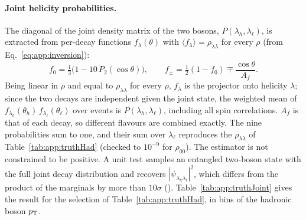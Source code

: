 \paragraph{Joint helicity probabilities.} The diagonal of the joint density matrix of the two bosons,
$P(\lambda_h, \lambda_\ell)$, is extracted from per-decay functions $f_\lambda(\theta)$ with $\langle f_\lambda\rangle =
\rho_{\lambda\lambda}$ for every $\rho$ (from Eq.~\eqref{eq:app:inversion}):
\begin{equation}
  f_0 = \tfrac13\big(1 - 10\,P_2(\cos\theta)\big), \qquad f_\pm = \tfrac12(1 - f_0) \mp \frac{\cos\theta}{A_f}.
\end{equation}
Being linear in $\rho$ and equal to $\rho_{\lambda\lambda}$ for every $\rho$, $f_\lambda$ is the projector onto
helicity $\lambda$; since the two decays are independent given the joint state, the weighted mean of
$f_{\lambda_h}(\theta_h)\,f_{\lambda_\ell}(\theta_\ell)$ over events is $P(\lambda_h, \lambda_\ell)$, including all spin
correlations. $A_f$ is that of each decay, so different flavours are combined exactly. The nine probabilities sum to
one, and their sum over $\lambda_\ell$ reproduces the $\rho_{\lambda\lambda}$ of Table~\ref{tab:app:truthHad} (checked to
$10^{-9}$ for $\rho_{00}$). The estimator is not constrained to be positive. A unit test samples an entangled two-boson
state with the full joint decay distribution and recovers $|\psi_{\lambda_h\lambda_\ell}|^2$, which differs from the
product of the marginals by more than $10\sigma$ (). Table~\ref{tab:app:truthJoint}
gives the result for the selection of Table~\ref{tab:app:truthHad}, in bins of the hadronic boson $p_{\mathrm{T}}$.
